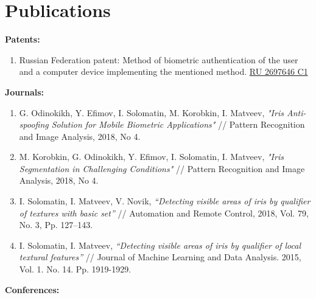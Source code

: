 \documentclass[a4paper,10pt]{article}
\begin{document}
\section{Publications}
\textbf{Patents:}
\begin{enumerate}
\item Russian Federation patent: Method of biometric authentication of the user and a computer device implementing the mentioned method. \href{http://new.fips.ru/publication-web/publications/document?type=doc&tab=IZPM&id=563975E5-21C6-42F2-A023-1485D06562B6}{RU 2697646 C1}
\end{enumerate}
\textbf{Journals:}
\begin{enumerate}
\item G. Odinokikh, Y. Efimov, I. Solomatin, M. Korobkin, I. Matveev, \textit{"Iris Anti-spoofing Solution for Mobile Biometric Applications"} // Pattern Recognition and Image Analysis, 2018, No 4.
\item M. Korobkin, G. Odinokikh, Y. Efimov, I. Solomatin, I. Matveev, \textit{"Iris Segmentation in Challenging Conditions"} // Pattern Recognition and Image Analysis, 2018, No 4.
\item I. Solomatin, I. Matveev, V. Novik, \textit{“Detecting visible areas of iris by qualifier of
textures with basic set”} // Automation and Remote Control, 2018, Vol. 79, No. 3, Pp. 127–143.
\item I. Solomatin, I. Matveev, \textit{“Detecting visible areas of iris by qualifier of local textural
features”} // Journal of Machine Learning and Data Analysis. 2015, Vol. 1. No. 14. Pp. 1919-1929.
\end{enumerate}
\textbf{Conferences:}
\end{document}
